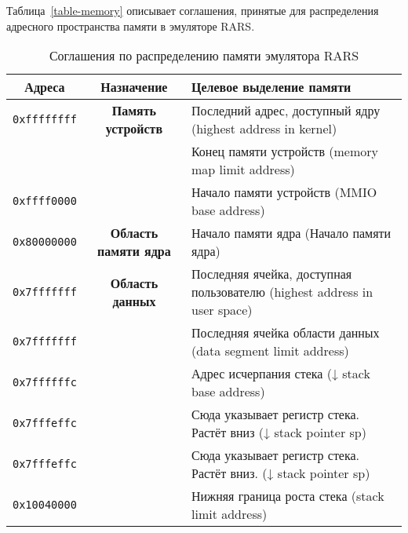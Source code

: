 
Таблица~\ref{table-memory} описывает соглашения, принятые для распределения адресного пространства памяти в эмуляторе RARS.

\begin{table}[h]
    \caption{Соглашения по распределению памяти эмулятора RARS}
    \centering
    \begin{tabularx}{\textwidth}{|c|c|X|}
        \hline
        \textbf{Адреса} & \textbf{Назначение} & \textbf{Целевое выделение памяти} \\
        \hline %
        \texttt{0xffffffff} & \textbf{Память устройств} & Последний адрес, доступный ядру (highest address in kernel) \\
        \hhline{~~-}
                            &  & Конец памяти устройств (memory map limit address) \\
        \hhline{-~-}
        \texttt{0xffff0000} &  & Начало памяти устройств  (MMIO base address) \\
        \hhline{---}
        \texttt{0x80000000} & \textbf{Область памяти ядра} & Начало памяти ядра (Начало памяти ядра) \\
        \hline
        \texttt{0x7fffffff} & \textbf{Область данных} & Последняя ячейка, доступная пользователю (highest address in user space) \\
        \hhline{~~-}
        \texttt{0x7fffffff} &  & Последняя ячейка области данных (data segment limit address) \\
        \hhline{-~-}
        \texttt{0x7ffffffc} &  &  Адрес исчерпания стека (↓ stack base address) \\
        \hhline{-~-}
        \texttt{0x7fffeffc} &  &  Сюда указывает регистр стека. Растёт вниз (↓ stack pointer sp) \\
        \hhline{-~-}
        \texttt{0x7fffeffc} &  &  Сюда указывает регистр стека. Растёт вниз. (↓ stack pointer sp) \\
        \hhline{-~-}
        \texttt{0x10040000} &  &  Нижняя граница роста стека (stack limit address) \\

\end{tabularx}
\end{table}
